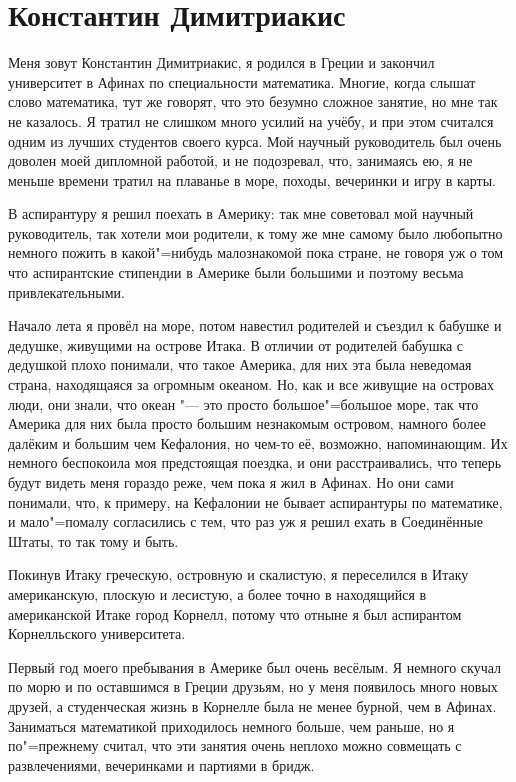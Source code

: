 \section{Константин Димитриакис}

Меня зовут Константин Димитриакис, я родился в Греции и закончил университет в
Афинах по специальности математика.
Многие, когда слышат слово математика, тут же говорят, что это безумно сложное
занятие, но мне так не казалось.
Я тратил не слишком много усилий на учёбу, и при этом считался одним из лучших
студентов своего курса.
Мой научный руководитель был очень доволен моей дипломной работой, и не
подозревал, что, занимаясь ею, я не меньше времени тратил на плаванье в море,
походы, вечеринки и игру в карты.

В аспирантуру я решил поехать в Америку: так мне советовал мой научный
руководитель, так хотели мои родители, к тому же мне самому было любопытно
немного пожить в какой"=нибудь малознакомой пока стране, не говоря уж о том что
аспирантские стипендии в Америке были большими и поэтому весьма привлекательными.

Начало лета я провёл на море, потом навестил родителей и съездил к бабушке и
дедушке, живущими на острове Итака.
В отличии от родителей бабушка с дедушкой плохо понимали, что такое Америка, для
них эта была неведомая страна, находящаяся за огромным океаном.
Но, как и все живущие на островах люди, они знали, что океан "--- это просто
большое"=большое море, так что Америка для них была просто большим незнакомым
островом, намного более далёким и большим чем Кефалония, но чем-то её, возможно,
напоминающим.
Их немного беспокоила моя предстоящая поездка, и они расстраивались, что теперь
будут видеть меня гораздо реже, чем пока я жил в Афинах. Но они сами понимали,
что, к примеру, на Кефалонии не бывает аспирантуры по математике, и мало"=помалу
согласились с тем, что раз уж я решил ехать в Соединённые Штаты, то так тому и
быть.

Покинув Итаку греческую, островную и скалистую, я переселился в Итаку
американскую, плоскую и лесистую, а более точно в находящийся в американской
Итаке город Корнелл, потому что отныне я был аспирантом Корнелльского
университета.

Первый год моего пребывания в Америке был очень весёлым.
Я немного скучал по морю и по оставшимся в Греции друзьям, но у меня появилось
много новых друзей, а студенческая жизнь в Корнелле была не менее бурной, чем в
Афинах.
Заниматься математикой приходилось немного больше, чем раньше, но я по"=прежнему
считал, что эти занятия очень неплохо можно совмещать с развлечениями,
вечеринками и партиями в бридж.


